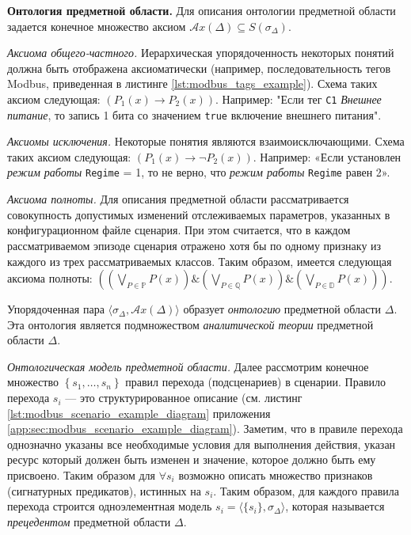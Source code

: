 \textbf{Онтология предметной области.}
Для описания онтологии предметной области задается конечное множество аксиом $\mathcal{A}x(\Delta) \subseteq S(\sigma_\Delta)$.
  
\textit{Аксиома общего-частного.}
Иерархическая упорядоченность некоторых понятий должна быть отображена аксиоматически (например, последовательность тегов Modbus, приведенная в листинге \ref{lst:modbus_tags_example}).
Схема таких аксиом следующая: $\left(P_1(x) \to P_2(x) \right)$.
Например: "Если тег \texttt{C1} \textit{Внешнее питание}, то запись 1 бита со значением \texttt{true} включение внешнего питания".

\textit{Аксиомы исключения.}
Некоторые понятия являются взаимоисключающими. Схема таких аксиом следующая:
$\left(P_1(x) \to \lnot P_2(x) \right)$.
Например: «Если установлен \textit{режим работы} \texttt{Regime} = 1, то не верно, что \textit{режим работы} \texttt{Regime} равен 2».

\textit{Аксиома полноты.}
Для описания предметной области рассматривается совокупность допустимых изменений отслеживаемых параметров,
указанных в конфигурационном файле сценария. При этом считается, что в каждом рассматриваемом эпизоде сценария
отражено хотя бы по одному признаку из каждого из трех рассматриваемых классов.
Таким образом, имеется следующая аксиома полноты:
$\left( \left(\bigvee_{P\in\mathbb{P}}P(x)\right) \& \left(\bigvee_{P\in\mathbb{Q}}P(x)\right) \& \left(\bigvee_{P\in\mathbb{D}}P(x)\right) \right)$.

Упорядоченная пара $\langle\sigma_\Delta, \mathcal{A}x(\Delta)\rangle$ образует \textit{онтологию} предметной области $\Delta$.
Эта онтология является подмножеством \textit{аналитической теории} предметной области $\Delta$.


\textit{Онтологическая модель предметной области.}
Далее рассмотрим конечное множество $\left\{ s_1, \ldots, s_n \right\}$ правил перехода (подсценариев) в сценарии.
Правило перехода $s_i$ --- это структурированное описание (см. листинг \ref{lst:modbus_scenario_example_diagram} приложения \ref{app:sec:modbus_scenario_example_diagram}).
Заметим, что в правиле перехода однозначно указаны все необходимые условия для выполнения действия,
указан ресурс который должен быть изменен и значение, которое должно быть ему присвоено.
Таким образом для $\forall s_i$ возможно описать множество признаков (сигнатурных предикатов), истинных на $s_i$.
Таким образом, для каждого правила перехода строится одноэлементная модель $s_i = \langle \{s_i\}, \sigma_\Delta \rangle$,
которая называется \textit{прецедентом} предметной области $\Delta$.

